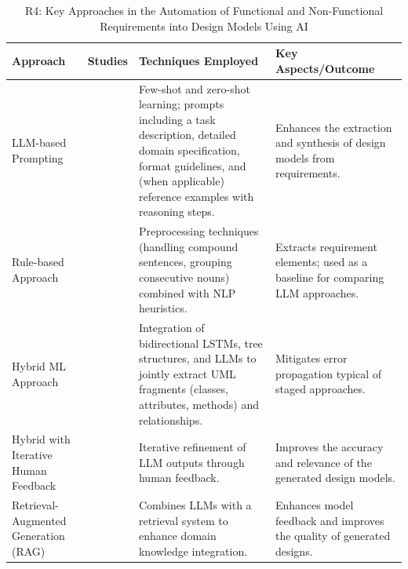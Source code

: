 \begin{table}[htb]
  \centering
  \small
  \renewcommand{\arraystretch}{0.9} %
  \setlength{\tabcolsep}{4pt}
  \begin{tabular}{p{3cm} p{2cm} p{5cm} p{5cm}}
  \toprule
  \textbf{Approach} & \textbf{Studies} & \textbf{Techniques Employed} & \textbf{Key Aspects/Outcome} \\
  \midrule
  LLM-based Prompting & \cite{14chaaben2023,9ruan2023,10chen2023}& 
  Few-shot and zero-shot learning; prompts including a task description, detailed domain specification, format guidelines, and (when applicable) reference examples with reasoning steps.
  & 
  Enhances the extraction and synthesis of design models from requirements. \\
  \midrule 
  Rule-based Approach & 
  \cite{4jahan2024} & 
  Preprocessing techniques (handling compound sentences, grouping consecutive nouns) combined with NLP heuristics.
  & 
  Extracts requirement elements; used as a baseline for comparing LLM approaches. \\
  \midrule 
  Hybrid ML Approach & \cite{2babaalla2024} & 
  Integration of bidirectional LSTMs, tree structures, and LLMs to jointly extract UML fragments (classes, attributes, methods) and relationships.
  & Mitigates error propagation typical of staged approaches. \\
  \midrule 
  Hybrid with Iterative Human Feedback & \cite{7eisenreich2024,3ahmad2023} &
  Iterative refinement of LLM outputs through human feedback.
  & 
  Improves the accuracy and relevance of the generated design models. \\
  \midrule 
  Retrieval-Augmented Generation (RAG) & 
  \cite{13benardi2024} & 
  Combines LLMs with a retrieval system to enhance domain knowledge integration.
  & 
  Enhances model feedback and improves the quality of generated designs. \\
  \end{tabular}
  \caption{R4: Key Approaches in the Automation of Functional and Non-Functional Requirements into Design Models Using AI}
  \label{tab:rq4-approaches}
  \end{table}

